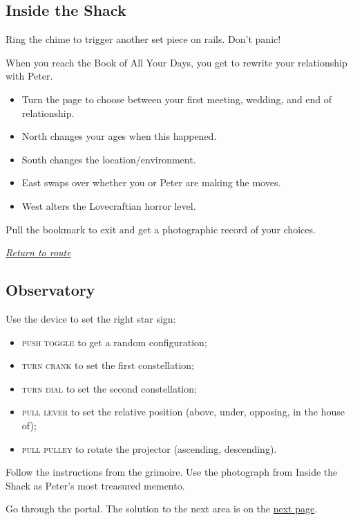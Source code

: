 \documentclass[a5paper]{extarticle}
\begin{document}
\newpage
\subsection{Inside the Shack}\label{sec:sol-Inside-the-Shack}

Ring the chime to trigger another set piece on rails. Don't panic!

When you reach the Book of All Your Days, you get to rewrite your relationship with Peter.

\begin{itemize}
\item
  Turn the page to choose between your first meeting, wedding, and end of relationship.
\item
  North changes your ages when this happened.
\item
  South changes the location\slash environment.
\item
  East swaps over whether you or Peter are making the moves.
\item
  West alters the Lovecraftian horror level.
\end{itemize}

Pull the bookmark to exit and get a photographic record of your choices.

\hyperref[sec:route-13]{\emph{Return to route}}

\newpage
\subsection{Observatory}\label{sec:sol-Observatory}

Use the device to set the right star sign:

\begin{itemize}
\item \textsc{push toggle} to get a random configuration;
\item \textsc{turn crank} to set the first constellation;
\item \textsc{turn dial} to set the second constellation;
\item \textsc{pull lever} to set the relative position (above, under, opposing, in the house of);
\item \textsc{pull pulley} to rotate the projector (ascending, descending).
\end{itemize}

Follow the instructions from the grimoire.
Use the photograph from Inside the Shack as Peter's most treasured memento.

Go through the portal. The solution to the next area is on the
\hyperref[sec:sol-Gulf-of-Nehilim]{next page}.
\end{document}
